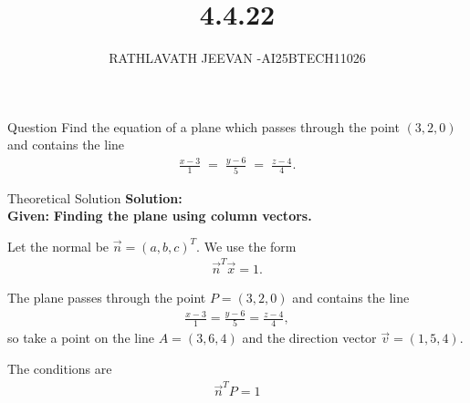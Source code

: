 \documentclass{beamer}
\title %
{4.4.22}
\author %
{RATHLAVATH JEEVAN -AI25BTECH11026}
\begin{document}
\frame{\titlepage}
\begin{frame}{Question}
Find the equation of a plane which passes through the point $(3,2,0)$ and contains the line
\begin{align}
\frac{x-3}{1} \;=\; \frac{y-6}{5} \;=\; \frac{z-4}{4}.
 \end{align}
\end{frame}
\begin{frame}{Theoretical Solution}
\textbf{Solution:}\\
 \textbf{Given:}  
\textbf{Finding the plane using column vectors.}


Let the normal be \(\vec{n}=(a,b,c)^T\). We use the form
\begin{align}
\vec{n}^T\vec{x}=1.
\end{align}

The plane passes through the point \(P=(3,2,0)\) and contains the line
\begin{align}
\frac{x-3}{1}=\frac{y-6}{5}=\frac{z-4}{4},
\end{align}
so take a point on the line \(A=(3,6,4)\) and the direction vector
\(\vec{v}=(1,5,4)\).

The conditions are
\begin{align}
\vec{n}^T P = 1
\end{align}
\end{frame}
\end{document}
